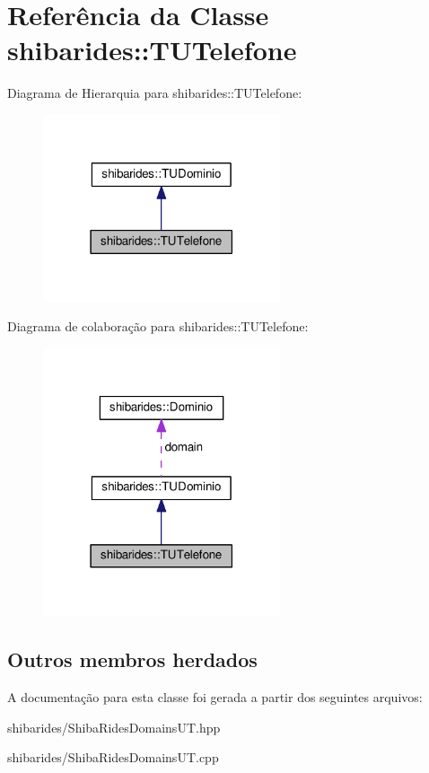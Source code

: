 \hypertarget{classshibarides_1_1TUTelefone}{}\section{Referência da Classe shibarides\+:\+:T\+U\+Telefone}
\label{classshibarides_1_1TUTelefone}


Diagrama de Hierarquia para shibarides\+:\+:T\+U\+Telefone\+:\nopagebreak
\begin{figure}[H]
\begin{center}
\leavevmode
\includegraphics[width=198pt]{classshibarides_1_1TUTelefone__inherit__graph}
\end{center}
\end{figure}


Diagrama de colaboração para shibarides\+:\+:T\+U\+Telefone\+:\nopagebreak
\begin{figure}[H]
\begin{center}
\leavevmode
\includegraphics[width=198pt]{classshibarides_1_1TUTelefone__coll__graph}
\end{center}
\end{figure}
\subsection*{Outros membros herdados}


A documentação para esta classe foi gerada a partir dos seguintes arquivos\+:\begin{DoxyCompactItemize}
\item 
shibarides/Shiba\+Rides\+Domains\+U\+T.\+hpp\item 
shibarides/Shiba\+Rides\+Domains\+U\+T.\+cpp\end{DoxyCompactItemize}
